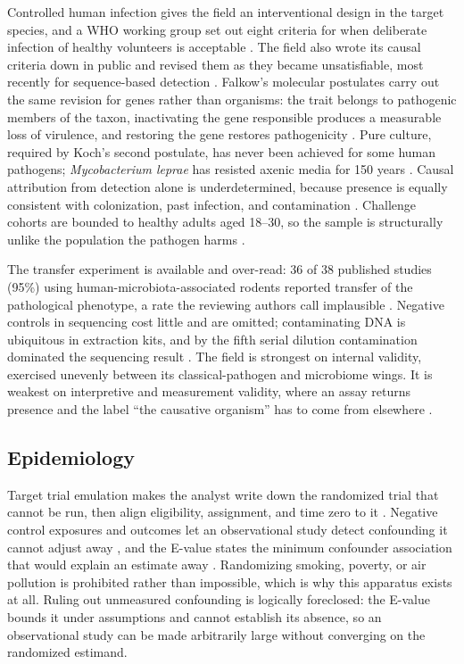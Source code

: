 \documentclass{article}
\begin{document}
Controlled human infection gives the field an interventional design in the target species, and a WHO working group set out eight criteria for when deliberate infection of healthy volunteers is acceptable \citep{jamrozik2021key}. The field also wrote its causal criteria down in public and revised them as they became unsatisfiable, most recently for sequence-based detection \citep{fredricks1996sequence}. Falkow's molecular postulates carry out the same revision for genes rather than organisms: the trait belongs to pathogenic members of the taxon, inactivating the gene responsible produces a measurable loss of virulence, and restoring the gene restores pathogenicity \citep{falkow1988molecular}. Pure culture, required by Koch's second postulate, has never been achieved for some human pathogens; \emph{Mycobacterium leprae} has resisted axenic media for 150 years \citep{gotorrivera2025silence}. Causal attribution from detection alone is underdetermined, because presence is equally consistent with colonization, past infection, and contamination \citep{zautner2017more}. Challenge cohorts are bounded to healthy adults aged 18--30, so the sample is structurally unlike the population the pathogen harms \citep{jamrozik2021key}.

The transfer experiment is available and over-read: 36 of 38 published studies (95\%) using human-microbiota-associated rodents reported transfer of the pathological phenotype, a rate the reviewing authors call implausible \citep{walter2020establishing}. Negative controls in sequencing cost little and are omitted; contaminating DNA is ubiquitous in extraction kits, and by the fifth serial dilution contamination dominated the sequencing result \citep{salter2014reagent}. The field is strongest on internal validity, exercised unevenly between its classical-pathogen and microbiome wings. It is weakest on interpretive and measurement validity, where an assay returns presence and the label ``the causative organism'' has to come from elsewhere \citep{zautner2017more}.

\subsection{Epidemiology}

Target trial emulation makes the analyst write down the randomized trial that cannot be run, then align eligibility, assignment, and time zero to it \citep{hernan2016specifying}. Negative control exposures and outcomes let an observational study detect confounding it cannot adjust away \citep{lipsitch2010negative}, and the E-value states the minimum confounder association that would explain an estimate away \citep{vanderweele2017sensitivity}. Randomizing smoking, poverty, or air pollution is prohibited rather than impossible, which is why this apparatus exists at all. Ruling out unmeasured confounding is logically foreclosed: the E-value bounds it under assumptions and cannot establish its absence, so an observational study can be made arbitrarily large without converging on the randomized estimand.
\end{document}
